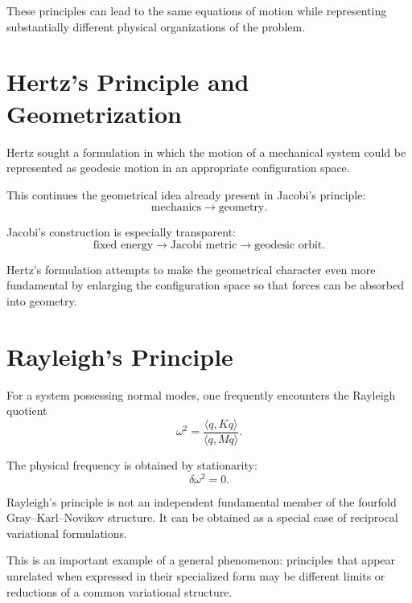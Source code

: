 These principles can lead to the same equations of motion while representing substantially different physical organizations of the problem.

\section{Hertz's Principle and Geometrization}

Hertz sought a formulation in which the motion of a mechanical system could be represented as geodesic motion in an appropriate configuration space.

This continues the geometrical idea already present in Jacobi's principle:
\begin{equation}
\text{mechanics}
\longrightarrow
\text{geometry}.
\end{equation}

Jacobi's construction is especially transparent:
\begin{equation}
\text{fixed energy}
\longrightarrow
\text{Jacobi metric}
\longrightarrow
\text{geodesic orbit}.
\end{equation}

Hertz's formulation attempts to make the geometrical character even more fundamental by enlarging the configuration space so that forces can be absorbed into geometry.

\section{Rayleigh's Principle}

For a system possessing normal modes, one frequently encounters the Rayleigh quotient
\begin{equation}
\omega^2
=
\frac{\langle q,Kq\rangle}
{\langle q,Mq\rangle}.
\end{equation}

The physical frequency is obtained by stationarity:
\begin{equation}
\boxed{
\delta\omega^2=0.
}
\end{equation}

Rayleigh's principle is not an independent fundamental member of the fourfold Gray--Karl--Novikov structure.  It can be obtained as a special case of reciprocal variational formulations.

This is an important example of a general phenomenon: principles that appear unrelated when expressed in their specialized form may be different limits or reductions of a common variational structure.

